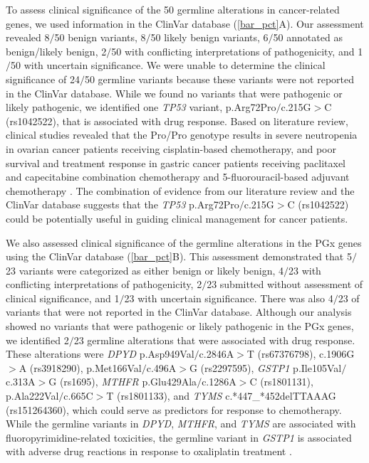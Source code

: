 \documentclass{bmcart}
\begin{document}
To assess clinical significance of the 50 germline alterations in cancer-related genes, we used information in the ClinVar database (\autoref{bar_pct}A). Our assessment revealed 8$/$50 benign variants, 8$/$50 likely benign variants, 6$/$50 annotated as benign/likely benign, 2$/$50 with conflicting interpretations of pathogenicity, and 1$/$50 with uncertain significance. We were unable to determine the clinical significance of 24$/$50 germline variants because these variants were not reported in the ClinVar database. While we found no variants that were pathogenic or likely pathogenic, we identified one \textit{TP53} variant, p.Arg72Pro$/$c.215G$>$C (rs1042522), that is associated with drug response. Based on literature review, clinical studies revealed that the Pro/Pro genotype results in severe neutropenia in ovarian cancer patients receiving cisplatin-based chemotherapy, and poor survival and treatment response in gastric cancer patients receiving paclitaxel and capecitabine combination chemotherapy and 5-fluorouracil-based adjuvant chemotherapy \cite{Khrunin2010, Zha2016, Kim2009, Bojesen2008, Bonafe2004, Huang2008, Yoneda2013, Yang2007, Bougeard2006, Cheng2012, Zhu2007, Zhang2012a}. The combination of evidence from our literature review and the ClinVar database suggests that the \textit{TP53} p.Arg72Pro$/$c.215G$>$C (rs1042522) could be potentially useful in guiding clinical management for cancer patients.

We also assessed clinical significance of the germline alterations in the PGx genes using the ClinVar database (\autoref{bar_pct}B). This assessment demonstrated that 5$/$23 variants were categorized as either benign or likely benign, 4$/$23 with conflicting interpretations of pathogenicity, 2$/$23 submitted without assessment of clinical significance, and 1$/$23 with uncertain significance. There was also 4$/$23 of variants that were not reported in the ClinVar database. Although our analysis showed no variants that were pathogenic or likely pathogenic in the PGx genes, we identified 2$/$23 germline alterations that were associated with drug response. These alterations were \textit{DPYD} p.Asp949Val$/$c.2846A$>$T (rs67376798), c.1906G$>$A (rs3918290), p.Met166Val$/$c.496A$>$G (rs2297595), \textit{GSTP1} p.Ile105Val$/$c.313A$>$G (rs1695), \textit{MTHFR} p.Glu429Ala$/$c.1286A$>$C (rs1801131), p.Ala222Val$/$c.665C$>$T (rs1801133), and \textit{TYMS} c.*447\_*452delTTAAAG (rs151264360), which could serve as predictors for response to chemotherapy. While the germline variants in \textit{DPYD}, \textit{MTHFR}, and \textit{TYMS} are associated with fluoropyrimidine-related toxicities, the germline variant in \textit{GSTP1} is associated with adverse drug reactions in response to oxaliplatin treatment \cite{Panczyk2014, Mohelnikova-Duchonova2014}.
\end{document}
